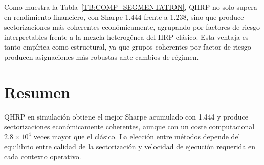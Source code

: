 Como muestra la Tabla~\ref{TB:COMP_SEGMENTATION}, \gls{QHRP} no solo supera en rendimiento financiero, con Sharpe 1.444 frente a 1.238, sino que produce sectorizaciones más coherentes económicamente, agrupando por factores de riesgo interpretables frente a la mezcla heterogénea del \gls{HRP} clásico. Esta ventaja es tanto empírica como estructural, ya que grupos coherentes por factor de riesgo producen asignaciones más robustas ante cambios de régimen.

\section{Resumen}
\gls{QHRP} en simulación obtiene el mejor Sharpe acumulado con 1.444 y produce sectorizaciones económicamente coherentes, aunque con un coste computacional $2.8\times10^4$ veces mayor que el clásico. La elección entre métodos depende del equilibrio entre calidad de la sectorización y velocidad de ejecución requerida en cada contexto operativo.

